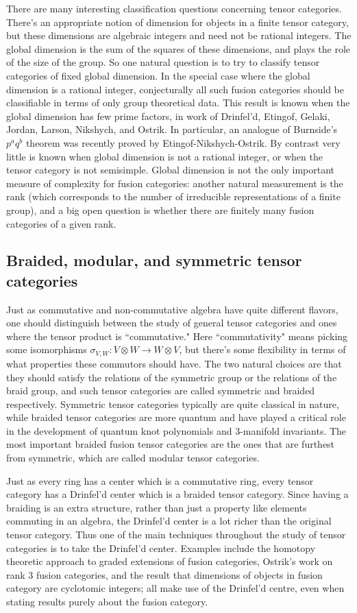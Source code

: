 \documentclass[12pt]{article}
\begin{document}
There are many interesting classification questions concerning tensor categories. There's an appropriate notion of dimension for objects in a finite tensor category, but these dimensions are algebraic integers and need not be rational integers. The global dimension is the sum of the squares of these dimensions, and plays the role of the size of the group. So one natural question is to try to classify tensor categories of fixed global dimension. In the special case where the global dimension is a rational integer, conjecturally all such fusion categories should be classifiable in terms of only group theoretical data.  This result is known when the global dimension has few prime factors, in work of Drinfel'd, Etingof, Gelaki, Jordan, Larson, Nikshych, and Ostrik. In particular, an analogue of Burnside's $p^a q^b$ theorem was recently proved by Etingof-Nikshych-Ostrik. By contrast very little is known when global dimension is not a rational integer, or when the tensor category is not semisimple. Global dimension is not the only important measure of complexity for fusion categories: another natural measurement is the rank (which corresponds to the number of irreducible representations of a finite group), and a big open question is whether there are finitely many fusion categories of a given rank.


\subsection{Braided, modular, and symmetric tensor categories}
Just as  commutative and non-commutative algebra have quite different flavors, one should distinguish between the study of general tensor categories and ones where the tensor product is ``commutative." Here ``commutativity" means picking some isomorphisms $\sigma_{V,W}: V \otimes W \rightarrow W \otimes V$, but there's some flexibility in terms of what properties these commutors should have. The two natural choices are that they should satisfy the relations of the symmetric group or the relations of the braid group, and such tensor categories are called symmetric and braided respectively. Symmetric tensor categories typically are quite classical in nature, while braided tensor categories are more quantum and have played a critical role in the development of quantum knot polynomials and 3-manifold invariants. The most important braided fusion tensor categories are the ones that are furthest from symmetric, which are called modular tensor categories.

Just as every ring has a center which is a commutative ring, every tensor category has a Drinfel'd center which is a braided tensor category. Since having a braiding is an extra structure, rather than just a property like elements commuting in an algebra, the Drinfel'd center is a lot richer than the original tensor category. Thus one of the main techniques throughout the study of tensor  categories is to take the Drinfel'd center.  Examples include the homotopy theoretic approach to graded extensions of fusion categories, Ostrik's work on rank 3 fusion categories, and the result that dimensions of objects in fusion category are cyclotomic integers; all make use of the Drinfel'd centre, even when stating results purely about the fusion category.
\end{document}
